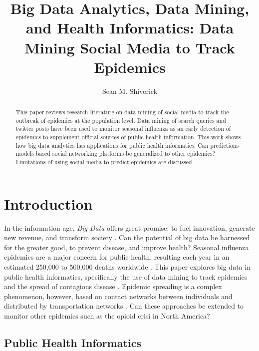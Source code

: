 \documentclass[sigconf]{acmart}
\begin{document}
\title{Big Data Analytics, Data Mining, and Health Informatics: 
Data Mining Social Media to Track Epidemics}
\author{Sean M. Shiverick}


\begin{abstract}
This paper reviews research literature on data mining of social media to 
track the outbreak of epidemics at the population level. Data mining of 
search queries and twitter posts have been used to monitor seasonal influenza
as an early detection of epidemics to supplement official sources of public 
health information. This work shows how big data analytics has applications 
for public health informatics. Can predictions models based social networking
platforms be generalized to other epidemics? Limitations of using social media 
to predict epidemics are discussed.
\end{abstract}



\maketitle

\section{Introduction}

In the information age, \textit{Big Data} offers great promise: to fuel innovation, 
generate new revenue, and transform society \cite{gupta15}. Can the 
potential of big data be harnessed for the greater good, to prevent disease, 
and improve health? Seasonal influenza epidemics are a major concern for public 
health, resulting each year in an estimated 250,000 to 500,000 deaths worldwide \cite{who17}. This paper explores big data in public health informatics, 
specifically the use of data mining to track epidemics and the spread of 
contagious disease \cite{hay13}. Epidemic spreading is a complex phenomenon, 
however, based on contact networks between individuals and distributed by 
transportation networks \cite{Colizza06}. Can these approaches be extended to 
monitor other epidemics such as the opioid crisi in North America? \cite{volkow14}


\subsection{Public Health Informatics}
\end{document}
